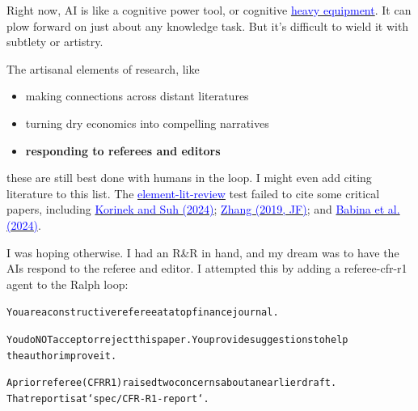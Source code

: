 \documentclass[12pt]{article}
\begin{document}
\begin{mdframed}[
linewidth=1pt,
linecolor=black,
innerleftmargin=0.25em,
innerrightmargin=0.25em,
innertopmargin=0.2\baselineskip,
innerbottommargin=0.8\baselineskip
]
Right now, AI is like a cognitive power tool, or cognitive \href{https://en.wikipedia.org/wiki/Heavy_equipment}{\textcolor{blue}{heavy equipment}}. It can plow forward on just about any knowledge task. But it's difficult to wield it with subtlety or artistry.

The artisanal elements of research, like

\vspace{-2ex}
\begin{itemize}
\setlength{\itemsep}{0.15em}
\setlength{\parskip}{0pt}
\item making connections across distant literatures
\item turning dry economics into compelling narratives
\item \textbf{responding to referees and editors}
\end{itemize}
\vspace{-2ex}

these are still best done with humans in the loop. I might even add citing literature to this list. The \href{https://github.com/chenandrewy/ralph-wiggum-asset-pricing/blob/main/tests/element-lit-review.py}{\textcolor{blue}{element-lit-review}} test failed to cite some critical papers, including \href{https://arxiv.org/abs/2403.12107v1}{\textcolor{blue}{Korinek and Suh (2024)}}; \href{https://onlinelibrary.wiley.com/doi/abs/10.1111/jofi.12766}{\textcolor{blue}{Zhang (2019, JF)}}; and \href{https://papers.ssrn.com/sol3/papers.cfm?abstract_id=4868770}{\textcolor{blue}{Babina et al. (2024)}}.

I was hoping otherwise. I had an R\&R in hand, and my dream was to have the AIs respond to the referee and editor. I attempted this by adding a \colorbox{gray!10}{\textcolor{red!70!black}{referee-cfr-r1}} agent to the Ralph loop:

\begin{mdframed}[backgroundcolor=gray!10,linewidth=0.6pt,linecolor=gray!70,roundcorner=2pt,innerleftmargin=0.6em,innerrightmargin=0.6em,innertopmargin=0.5\baselineskip,innerbottommargin=0.5\baselineskip]
\begingroup
\small
\setlength{\parindent}{0pt}
\setlength{\parskip}{0pt}
\begin{alltt}

You are a constructive referee at a top finance journal.

You do NOT accept or reject this paper. You provide suggestions to help 
the author improve it.

A prior referee (CFR R1) raised two concerns about an earlier draft. 
That report is at `spec/CFR-R1-report`.
\end{alltt}
\endgroup
\end{mdframed}


\end{mdframed}
\end{document}

